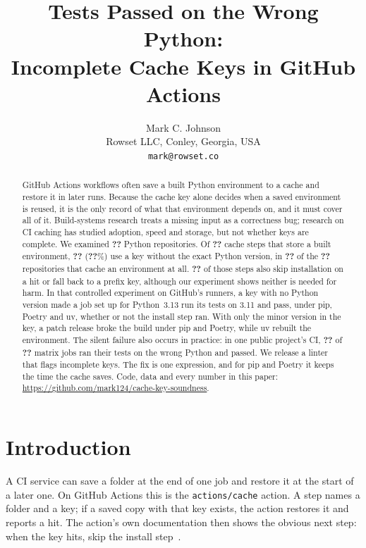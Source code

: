 \documentclass[10pt,a4paper]{article}
\title{Tests Passed on the Wrong Python:\\
Incomplete Cache Keys in GitHub Actions}
\author{Mark C. Johnson\\ Rowset LLC, Conley, Georgia, USA\\ \texttt{mark@rowset.co}}
\date{}
\newcommand{\ck}[1]{\textbf{??}}\newcommand{\repourl}{\url{https://github.com/mark124/cache-key-soundness}}%
\begin{document}
\maketitle

\begin{abstract}
GitHub Actions workflows often save a built Python environment to a cache and
restore it in later runs. Because the cache key alone decides when a saved
environment is reused, it is the only record of what that environment depends
on, and it must cover all of it. Build-systems research treats a missing input
as a correctness bug; research on CI caching has studied adoption, speed and
storage, but not whether keys are complete. We examined \ck{h.repos_sampled}
Python repositories. Of \ck{h.built_env_steps} cache steps that store a built
environment, \ck{h.unsound_steps} (\ck{h.unsound_pct_of_built}\%) use a key
without the exact Python version, in \ck{h.repos_any_unsound} of the
\ck{h.repos_caching_built_env} repositories that cache an environment at all.
\ck{h.unsound_with_skip_or_restore_keys} of those steps also skip installation
on a hit or fall back to a prefix key, although our experiment shows neither is
needed for harm. In that controlled experiment on GitHub's runners, a key with
no Python version made a job set up for Python~3.13 run its tests on 3.11 and
pass, under pip, Poetry and uv, whether or not the install step ran. With only the minor version in the key, a
patch release broke the build under pip and Poetry, while uv rebuilt the
environment. The silent failure also occurs in practice: in one public
project's CI, \ck{w.wild_jobs_wrong_python} of \ck{w.wild_jobs_in_live_run} matrix jobs ran their tests
on the wrong Python and passed. We release a linter that flags incomplete keys. The fix is one
expression, and for pip and Poetry it keeps the time the cache saves. Code,
data and every number in this paper: \repourl.
\end{abstract}

\section{Introduction}

A CI service can save a folder at the end of one job and restore it at the
start of a later one. On GitHub Actions this is the \texttt{actions/cache}
action. A step names a folder and a key; if a saved copy with that key
exists, the action restores it and reports a hit. The action's own documentation then
shows the obvious next step: when the key hits, skip the install
step~\cite{actionscache}.
\end{document}
